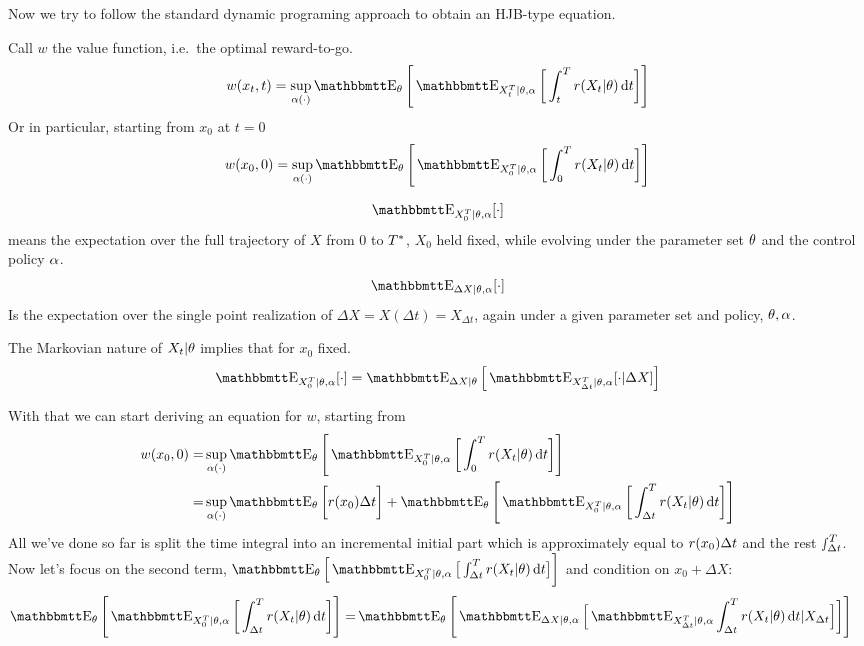 \documentclass{article}
\begin{document}
Now we try to follow the standard dynamic programing approach to obtain an
HJB-type equation. 

Call $w$ the value function, i.e.\ the optimal reward-to-go.
\begin{equation}
w(x_t, t) = \sup_{\a(\cdot)} 
\Exp_\th \Bigg[ \Exp_{X_t^T|\th, \a} \bigg[ \int_t^T r(X_t| \th) \intd{t}
\bigg]\Bigg]
\label{eq:value_function_with_prior_defn}
\end{equation}
Or in particular, starting from $x_0$ at $t=0$ 
\begin{equation}
w(x_0, 0) = \sup_{\a(\cdot)} 
\Exp_\th \Bigg[ \Exp_{X_0^T|\th, \a} \bigg[ \int_0^T r(X_t| \th) \intd{t}
\bigg]\Bigg]
\end{equation} 

$$
\Exp_{X_0^T|\th, \a} [\cdot] 
$$
means the expectation over the full trajectory of $X$ from $0$ to ${ T^* }$, $X_0$
held fixed, while evolving under the parameter set ${\theta}$ and the control
policy ${\alpha}$.
$$
\Exp_{\Delta X|\th, \a} [\cdot] 
$$
Is the expectation over the single point realization of $\Delta X = X(\Delta t)
= X_{\Delta t}$, again under a given parameter set and policy, ${\theta}, {\alpha}$.

The Markovian nature of $X_t|{\theta}$ implies that for $x_0$ fixed.
$$
\Exp_{X_0^T|\th, \a} [\cdot ] =
\Exp_{\Delta X|\th} \Big[ \Exp_{X_{\Delta t}^T|\th, \a} [ \cdot  | \Delta X ]
\Big] $$

With that we can start deriving an equation for $w$, starting from
\begin{align*}
w(x_0, 0) =& \sup_{\a(\cdot)} 
\Exp_\th \Bigg[ \Exp_{X_0^T|\th, \a} \bigg[ \int_0^T r(X_t| \th) \intd{t}
\bigg] \Bigg]
\\
=&  \sup_{\a(\cdot)} 
\Exp_\th \bigg[ r(x_0) \Delta t \bigg] + 
\Exp_\th \Bigg[ \Exp_{X_0^T|\th, \a} \bigg[ \int_{\Delta t}^T r(X_t| \th)
\intd{t} \bigg] \Bigg]
\end{align*}
All we've done so far is split the time integral into an incremental initial
part which is approximately equal to $r(x_0){ \Delta t }$ and the rest $\smallint_{ \Delta t }^T$.
Now let's focus on the second term, $\Exp_\th \Big[ \Exp_{X_0^T|\th, \a} \big[ \int_{\Delta t}^T r(X_t| \th)
\intd{t} \big] \bigg]$ and condition on $x_0 + \Delta X$:
\begin{align*}
\Exp_\th \Bigg[ \Exp_{X_0^T|\th, \a} \bigg[ \int_{\Delta t}^T r(X_t| \th)
\intd{t} \bigg] \Bigg]
=&  
\Exp_\th \Bigg[ \Exp_{\Delta X |\th, \a} \Big[ \Exp_{X_{\dt}^T|\th, \a}
\int_\dt^T r(X_t| \th) \intd{t} | X_\dt \Big] \bigg] \Bigg]
\end{align*}
\end{document}
